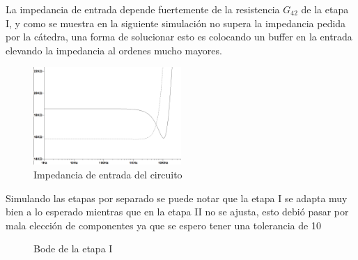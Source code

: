 La impedancia de entrada depende fuertemente de la resistencia $G_{42}$ de la etapa I, y como se muestra en la siguiente simulación no supera la impedancia pedida por la cátedra, una forma de solucionar esto es colocando un buffer en la entrada elevando la impedancia al ordenes mucho mayores.

\begin{figure}[h]
	\includegraphics[width=0.5\textwidth]{../Ejercicio2-DisenoDeCeldas/3CeldaSedra/Imagenes/MagImpedancia.png}
	\centering
	\caption{Impedancia de entrada del circuito}
\end{figure}


Simulando las etapas por separado se puede notar que la etapa I se adapta muy bien a lo esperado mientras que en la etapa II no se ajusta, esto debió pasar por mala elección de componentes ya que se espero tener una tolerancia de 10%

\begin{figure}[h]
 \centering
 \caption{Bode de la etapa I}
 \label{f:etapaIbode}
\end{figure}

